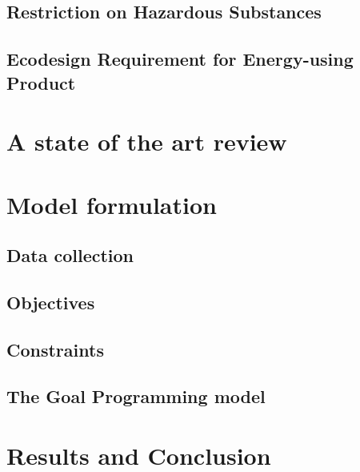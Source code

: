 \documentclass{article}
\begin{document}
\subsection{Restriction on Hazardous Substances}
\subsection{Ecodesign Requirement for Energy-using Product}

\section{A state of the art review}

\section{Model formulation}
\subsection{Data collection}
\subsection{Objectives}
\subsection{Constraints}
\subsection{The Goal Programming model}

\section{Results and Conclusion}
\end{document}
